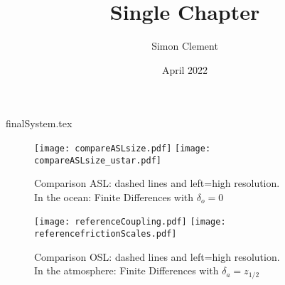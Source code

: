 \documentclass{article}
\title{Single Chapter}
\author{Simon Clement}
\date{April 2022}
\begin{document}
\def\cal{\mathscr}
\tableofcontents
{finalSystem.tex}
\begin{figure}
	\texttt{[image: compareASLsize.pdf]}
	\texttt{[image: compareASLsize\_ustar.pdf]}
	\caption{Comparison ASL: dashed lines and left=high resolution.\\
	In the ocean: Finite Differences with $\delta_o=0$}
	\label{fig:compareASL}
\end{figure}
\begin{figure}
	\texttt{[image: referenceCoupling.pdf]}
	\texttt{[image: referencefrictionScales.pdf]}
	\caption{Comparison OSL: dashed lines and left=high resolution.\\
	In the atmosphere: Finite Differences with $\delta_a = z_{1/2}$}
	\label{fig:compareOSL}
\end{figure}
\end{document}
